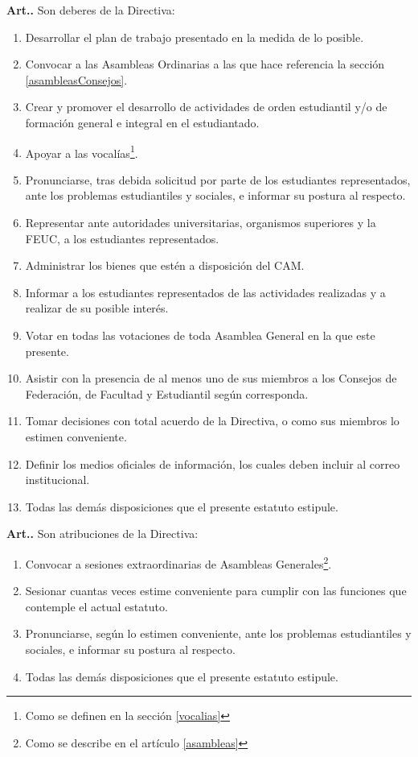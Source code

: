 \documentclass[letterpaper,11pt]{article}
\newcounter{art}
\newenvironment{art}{\refstepcounter{art}\mbox{\textbf{Art.{\space}\theart.}}\ignorespaces}{}
\begin{document}
\begin{art}\label{deberesDirectiva}
    Son deberes de la Directiva:
    \begin{enumerate}
        \item Desarrollar el plan de trabajo presentado en la medida de lo posible.
        \item Convocar a las Asambleas Ordinarias a las que hace referencia la sección \ref{asambleasConsejos}.
        \item Crear y promover el desarrollo de actividades de orden estudiantil y/o de formación general e integral en el estudiantado.
        \item Apoyar a las vocalías\footnote{Como se definen en la sección \ref{vocalias}}.
        \item Pronunciarse, tras debida solicitud por parte de los estudiantes representados, ante los problemas estudiantiles y sociales, e informar su postura al respecto.
        \item Representar ante autoridades universitarias, organismos superiores y la FEUC, a los estudiantes representados.
        \item Administrar los bienes que estén a disposición del CAM.
        \item Informar a los estudiantes representados de las actividades realizadas y a realizar de su posible interés.
        \item Votar en todas las votaciones de toda Asamblea General en la que este presente.
        \item Asistir con la presencia de al menos uno de sus miembros a los Consejos de Federación, de Facultad y Estudiantil según corresponda.
        \item Tomar decisiones con total acuerdo de la Directiva, o como sus miembros lo estimen conveniente.
        \item Definir los medios oficiales de información, los cuales deben incluir al correo institucional.
        \item Todas las demás disposiciones que el presente estatuto estipule.
    \end{enumerate}
\end{art}

\begin{art}\label{atribucionesDirectiva}
    Son atribuciones de la Directiva:
    \begin{enumerate}
        \item Convocar a sesiones extraordinarias de Asambleas Generales\footnote{Como se describe en el artículo \ref{asambleas}}.
        \item Sesionar cuantas veces estime conveniente para cumplir con las funciones que contemple el actual estatuto.
        \item Pronunciarse, según lo estimen conveniente, ante los problemas estudiantiles y sociales, e informar su postura al respecto.
        \item Todas las demás disposiciones que el presente estatuto estipule.
    \end{enumerate}
\end{art}
\end{document}
